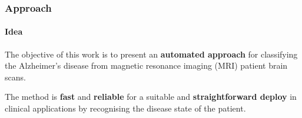 \begin{frame}
	\frametitle{Approach}
	\framesubtitle{Idea}
	
	\Large
	
	\vspace{0.2cm}
	
	The objective of this work is to present an \textbf{automated approach} for classifying the
	Alzheimer's disease from magnetic resonance imaging (MRI) patient brain scans.
	
	\vspace{0.1cm}
	
	The method is \textbf{fast} and \textbf{reliable} for a suitable and \textbf{straightforward
	deploy} in clinical applications by recognising the disease state of the patient.
	
	\vspace{-0.1cm}
	
	\begin{center}
	\end{center}
\end{frame}

